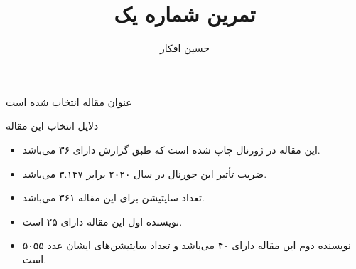 \documentclass[a4paper, 11pt]{article}
\title{
    تمرین شماره یک
}
\author{حسین افکار}
\begin{document}
\maketitle

عنوان مقاله انتخاب شده
است

دلایل انتخاب این مقاله
\begin{itemize}
    \item این مقاله در ژورنال
    چاپ شده است که طبق گزارش
    دارای
    ۳۶ می‌باشد.
    \item ضریب تأثیر این جورنال در سال ۲۰۲۰ برابر ۳.۱۴۷ می‌باشد.
    \item تعداد سایتیشن برای این مقاله ۳۶۱ می‌باشد.
    \item نویسنده اول این مقاله دارای
    ۲۵ است.
    \item نویسنده دوم این مقاله دارای 
    ۴۰ می‌باشد و تعداد سایتیشن‌های ایشان عدد ۵۰۵۵ است.
\end{itemize}


\end{document}
